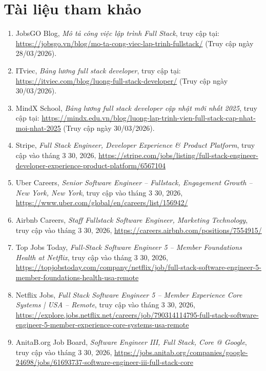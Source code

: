 \documentclass[12pt,a4paper]{article}
\begin{document}
\section{Tài liệu tham khảo}

\begin{sloppypar}
\begin{enumerate}
    \item JobsGO Blog, \textit{Mô tả công việc lập trình Full Stack}, truy cập tại: \url{https://jobsgo.vn/blog/mo-ta-cong-viec-lap-trinh-fullstack/} (Truy cập ngày 28/03/2026).
    \item ITviec, \textit{Bảng lương full stack developer}, truy cập tại: \url{https://itviec.com/blog/luong-full-stack-developer/} (Truy cập ngày 30/03/2026).
    \item MindX School, \textit{Bảng lương full stack developer cập nhật mới nhất 2025}, truy cập tại: \url{https://mindx.edu.vn/blog/luong-lap-trinh-vien-full-stack-cap-nhat-moi-nhat-2025} (Truy cập ngày 30/03/2026).
    \item Stripe, \textit{Full Stack Engineer, Developer Experience \& Product Platform}, truy cập vào tháng 3 30, 2026, \url{https://stripe.com/jobs/listing/full-stack-engineer-developer-experience-product-platform/6567104}
    \item Uber Careers, \textit{Senior Software Engineer – Fullstack, Engagement Growth – New York, New York}, truy cập vào tháng 3 30, 2026, \url{https://www.uber.com/global/en/careers/list/156942/}
    \item Airbnb Careers, \textit{Staff Fullstack Software Engineer, Marketing Technology}, truy cập vào tháng 3 30, 2026, \url{https://careers.airbnb.com/positions/7554915/}
    \item Top Jobs Today, \textit{Full-Stack Software Engineer 5 – Member Foundations Health at Netflix}, truy cập vào tháng 3 30, 2026, \url{https://topjobstoday.com/company/netflix/job/full-stack-software-engineer-5-member-foundations-health-usa-remote}
    \item Netflix Jobs, \textit{Full Stack Software Engineer 5 – Member Experience Core Systems | USA – Remote}, truy cập vào tháng 3 30, 2026, \url{https://explore.jobs.netflix.net/careers/job/790314114795-full-stack-software-engineer-5-member-experience-core-systems-usa-remote}
    \item AnitaB.org Job Board, \textit{Software Engineer III, Full Stack, Core @ Google}, truy cập vào tháng 3 30, 2026, \url{https://jobs.anitab.org/companies/google-24698/jobs/61693737-software-engineer-iii-full-stack-core}

\end{enumerate}
\end{sloppypar}
\end{document}
